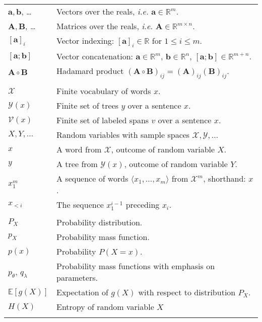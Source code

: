 %
% 

\begin{table}[h]
\center

  \begin{tabular}{ll}

    $\mathbf{a}, \mathbf{b}$, \dots  & Vectors over the reals, \textit{i.e.} $\mathbf{a} \in \mathbb{R}^m$.  \\
    $\mathbf{A}, \mathbf{B}$, \dots & Matrices over the reals, \textit{i.e.} $\mathbf{A} \in \mathbb{R}^{m \times n}$.   \\
    $[\mathbf{a}]_i$ & Vector indexing: $[\mathbf{a}]_i \in \mathbb{R}$ for $1 \leq i \leq m$. \\
    $[\mathbf{a}; \mathbf{b}]$ & Vector concatenation: $\mathbf{a} \in \mathbb{R}^{m}$, $\mathbf{b} \in \mathbb{R}^{n}$, $[\mathbf{a}; \mathbf{b}] \in \mathbb{R}^{m+n}$.  \\
    $\mathbf{A} \circ \mathbf{B}$ & Hadamard product $(\mathbf{A} \circ \mathbf{B})_{ij} = (\mathbf{A})_{ij}(\mathbf{B})_{ij}$. \\
    & \\

    $\mathcal{X}$ & Finite vocabulary of words $x$. \\
    $\mathcal{Y}(x)$ & Finite set of trees $y$ over a sentence $x$.  \\
    $\mathcal{V}(x)$ & Finite set of labeled spans $v$ over a sentence $x$.  \\
    $X, Y, \dots$ & Random variables with sample spaces $\mathcal{X}, \mathcal{Y}, \dots$  \\
    $x$ & A word from $\mathcal{X}$, outcome of random variable $X$.   \\
    $y$ & A tree from $\mathcal{Y}(x)$, outcome of random variable $Y$.  \\
    $x_1^m$ & A sequence of words $\langle x_1, \dots, x_m \rangle$ from $\mathcal{X}^m$, shorthand: $x$. \\
    $x_{<i}$ & The sequence $x_{1}^{i-1}$ preceding $x_i$.  \\
    & \\

    $P_X$ & Probability distribution.  \\
    $p_{X}$ & Probability mass function. \\
    $p(x)$ & Probability $P(X = x)$. \\
    $p_{\theta}$, $q_{\lambda}$ & Probability mass functions with emphasis on parameters.   \\
    $\mathbb{E}[g(X)]$ & Expectation of $g(X)$ with respect to distribution $P_X$.  \\
    $H(X)$ & Entropy of random variable $X$ \\
    & \\


\end{tabular}
\end{table}
